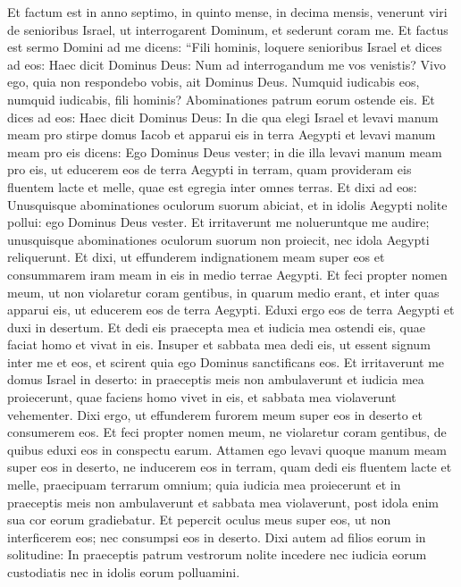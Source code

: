 \begin{biblechapter}  
\verse Et factum est in anno septimo, in quinto mense, in decima mensis, venerunt viri de senioribus Israel, ut interrogarent Dominum, et sederunt coram me. 
\verse Et factus est sermo Domini ad me dicens: 
\verse “Fili hominis, loquere senioribus Israel et dices ad eos: Haec dicit Dominus Deus: Num ad interrogandum me vos venistis? Vivo ego, quia non respondebo vobis, ait Dominus Deus. 
\verse Numquid iudicabis eos, numquid iudicabis, fili hominis? Abominationes patrum eorum ostende eis. 
\verse Et dices ad eos: Haec dicit Dominus Deus: In die qua elegi Israel et levavi manum meam pro stirpe domus Iacob et apparui eis in terra Aegypti et levavi manum meam pro eis dicens: Ego Dominus Deus vester; 
\verse in die illa levavi manum meam pro eis, ut educerem eos de terra Aegypti in terram, quam provideram eis fluentem lacte et melle, quae est egregia inter omnes terras. 
\verse Et dixi ad eos: Unusquisque abominationes oculorum suorum abiciat, et in idolis Aegypti nolite pollui: ego Dominus Deus vester. 
\verse Et irritaverunt me nolueruntque me audire; unusquisque abominationes oculorum suorum non proiecit, nec idola Aegypti reliquerunt. Et dixi, ut effunderem indignationem meam super eos et consummarem iram meam in eis in medio terrae Aegypti. 
\verse Et feci propter nomen meum, ut non violaretur coram gentibus, in quarum medio erant, et inter quas apparui eis, ut educerem eos de terra Aegypti. 
\verse Eduxi ergo eos de terra Aegypti et duxi in desertum. 
\verse Et dedi eis praecepta mea et iudicia mea ostendi eis, quae faciat homo et vivat in eis. 
\verse Insuper et sabbata mea dedi eis, ut essent signum inter me et eos, et scirent quia ego Dominus sanctificans eos. 
\verse Et irritaverunt me domus Israel in deserto: in praeceptis meis non ambulaverunt et iudicia mea proiecerunt, quae faciens homo vivet in eis, et sabbata mea violaverunt vehementer. Dixi ergo, ut effunderem furorem meum super eos in deserto et consumerem eos. 
\verse Et feci propter nomen meum, ne violaretur coram gentibus, de quibus eduxi eos in conspectu earum. 
\verse Attamen ego levavi quoque manum meam super eos in deserto, ne inducerem eos in terram, quam dedi eis fluentem lacte et melle, praecipuam terrarum omnium; 
\verse quia iudicia mea proiecerunt et in praeceptis meis non ambulaverunt et sabbata mea violaverunt, post idola enim sua cor eorum gradiebatur. 
\verse Et pepercit oculus meus super eos, ut non interficerem eos; nec consumpsi eos in deserto. 
\verse Dixi autem ad filios eorum in solitudine: In praeceptis patrum vestrorum nolite incedere nec iudicia eorum custodiatis nec in idolis eorum polluamini.  

\end{biblechapter}
